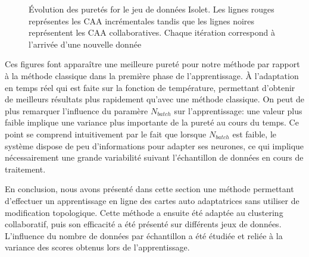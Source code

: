 \begin{figure}[!h]
                \caption{Évolution des puretés for le jeu de données Isolet. Les lignes rouges représentes les CAA incrémentales tandis que les lignes noires représentent les CAA collaboratives. Chaque itération correspond à l'arrivée d'une nouvelle donnée}
\label{sum_fig:isom}
				\end{figure}


    Ces figures font apparaître une meilleure pureté pour notre méthode par rapport à la méthode classique dans la première phase de l'apprentissage. À l'adaptation en temps réel qui est faite sur la fonction de température, permettant d'obtenir de meilleurs résultats plus rapidement qu'avec une méthode classique. On peut de plus remarquer l'influence du paramère $N_{batch}$ sur l'apprentissage: une valeur plus faible implique une variance plus importante de la pureté au cours du temps. Ce point se comprend intuitivement par le fait que lorsque $N_{batch}$ est faible, le système dispose de peu d'informations pour adapter ses neurones, ce qui implique nécessairement une grande variabilité suivant l'échantillon de données en cours de traitement.

    En conclusion, nous avons présenté dans cette section une méthode permettant d'effectuer un apprentissage en ligne des cartes auto adaptatrices sans utiliser de modification topologique. Cette méthode a ensuite été adaptée au clustering collaboratif, puis son efficacité a été présenté sur différents jeux de données. L'influence du nombre de données par échantillon a été étudiée et reliée à la variance des scores obtenus lors de l'apprentissage.

